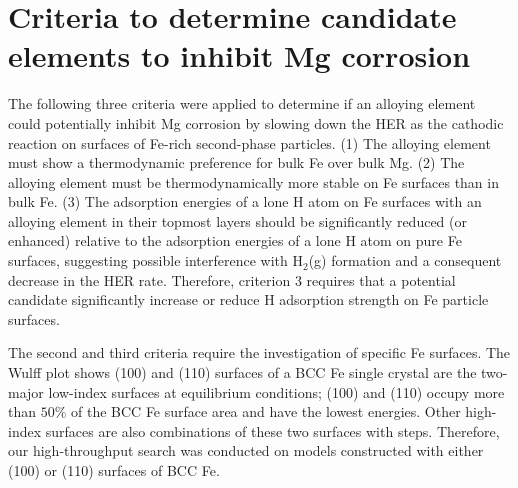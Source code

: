 \section{Criteria to determine candidate elements to inhibit Mg corrosion}
\label{chap:Mg_H:sec:criteria}

The following three criteria were applied to determine if an alloying element could potentially inhibit Mg corrosion by slowing down the \ac{HER} as the cathodic reaction on surfaces of Fe-rich second-phase particles. (1) The alloying element must show a thermodynamic preference for bulk Fe over bulk Mg. (2) The alloying element must be thermodynamically more stable on Fe surfaces than in bulk Fe. (3) The adsorption energies of a lone H atom on Fe surfaces with an alloying element in their topmost layers should be significantly reduced (or enhanced) relative to the adsorption energies of a lone H atom on pure Fe surfaces, suggesting possible interference with $\text{H}_2$(g) formation and a consequent decrease in the \ac{HER} rate. Therefore, criterion 3 requires that a potential candidate significantly increase or reduce H adsorption strength on Fe particle surfaces.


The second and third criteria require the investigation of specific Fe surfaces. The Wulff plot shows (100) and (110) surfaces of a \ac{BCC} Fe single crystal are the two-major low-index surfaces at equilibrium conditions; (100) and (110) occupy more than $\text{50}\%$ of the \ac{BCC} Fe surface area and have the lowest energies\cite{tran2016surface}. Other high-index surfaces are also combinations of these two surfaces with steps. Therefore, our high-throughput search was conducted on models constructed with either (100) or (110) surfaces of \ac{BCC} Fe.

